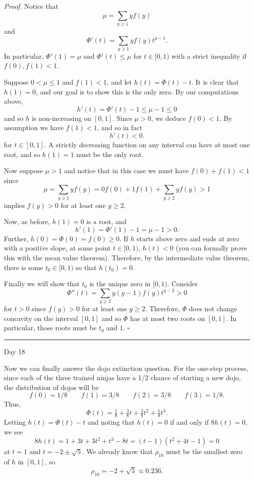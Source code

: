 \documentclass{problemset}
\newcommand{\fatrule}[1]{\vspace{.3cm}\hrule {\hfill \sf #1}\par}
\newenvironment{proof}{\emph{Proof.}}{\hfill$\square$}
\begin{document}
	\begin{proof}
		Notice that
		\[
			\mu = \sum_{y\geq 1} yf(y)
		\]
		and
		\[
			\Phi'(t) = \sum_{y\geq 1} yf(y) t^{y-1}.
		\]
		In particular, $\Phi'(1) =\mu$ and $\Phi'(t) \leq \mu$ for $t\in [0,1)$ with 
			a strict inequality if $f(0),f(1)<1$.

		Suppose $0<\mu\leq 1$ and $f(1) < 1$, and let $h(t) = \Phi(t)-t$.  It is clear that
		$h(1)=0$, and our goal is to show this is the only zero.  By our computations above,
		\[
			h'(t) = \Phi'(t) - 1\leq \mu-1 \leq 0
		\]
		and so $h$ is non-increasing on $[0,1]$.  Since $\mu >0$, we deduce $f(0)<1$.  By assumption
		we have $f(1) < 1$, and so in fact
		\[
			h'(t) < 0.
		\]
		for $t\in[0,1]$.  A strictly decreasing function on any interval can have at most one root,
		and so $h(1)=1$ must be the only root.

		Now suppose $\mu > 1$ and notice that in this case we must have $f(0)+f(1) < 1$ since
		\[
			\mu = \sum_{y\geq 1} yf(y) = 0f(0) +1f(1) + \sum_{y\geq 2} yf(y) > 1
		\]
		implies $f(y) > 0$ for at least one $y\geq 2$.

		Now, as before, $h(1)=0$ is a root, and 
		\[
			h'(1) = \Phi'(1) - 1=\mu-1 > 0.
		\]
		Further, $h(0)=\Phi(0) = f(0)\geq 0$.  If $h$ starts above zero
		and ends at zero with a positive slope, at some point $t\in[0,1)$,
			$h(t)<0$ (you can formally
			prove this with the mean value theorem).  
			Therefore, by the intermediate value theorem, there is some $t_0\in[0,1)$
				so that $h(t_0)=0$.

		Finally we will show that $t_0$ is the unique zero in $[0,1)$.  Consider
		\[
			\Phi''(t) = \sum_{y\geq 2} y(y-1)f(y)t^{y-2} > 0
		\]
		for $t>0$ since $f(y)>0$ for at least one $y\geq 2$.  Therefore, $\Phi$ does not
		change concavity on the interval $[0,1]$ and so $\Phi$ has at most two roots 
		on $[0,1]$.  In particular, those roots must be $t_0$ and $1$.
	\end{proof}

	\fatrule{Day 18}
	Now we can finally answer the dojo extinction question.  For the one-step process,
	since each of the three trained ninjas have a 1/2 chance of starting a new dojo, 
	the distribution of dojos will be
	\[
		f(0) = 1/8\qquad f(1)=3/8 \qquad f(2)=3/8 \qquad f(3) = 1/8.
	\]
	Thus, 
	\[
		\Phi(t) = \tfrac{1}{8} + \tfrac{3}{8}t + \tfrac{3}{8}t^2+\tfrac{1}{8}t^3.
	\]
	Letting $h(t) = \Phi(t)-t$ and noting that $h(t)=0$ if and only if $8h(t)=0$, 
	we see
	\[
		8h(t) = 1+3t+3t^2+t^3-8t = (t-1)(t^2+4t-1)=0
	\]
	at $t=1$ and $t=-2\pm \sqrt{5}$.  We already know that $\rho_{10}$ must be the smallest 
	zero of $h$ in $[0,1]$, so 
	\[
		\rho_{10} = -2+\sqrt{5} \approx 0.236.
	\]
\end{document}
